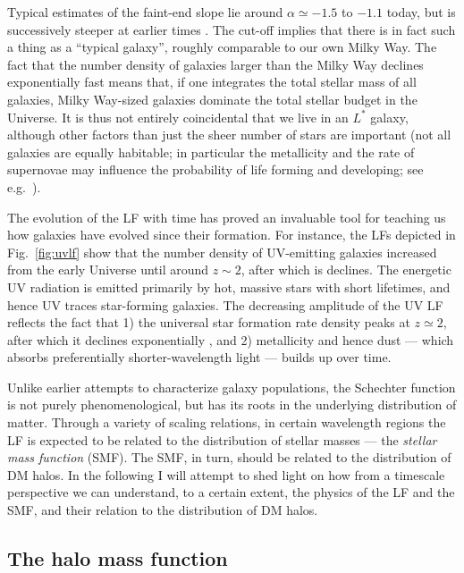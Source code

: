 \documentclass[useAMS]{aa}
\begin{document}
Typical estimates of the faint-end slope lie around $\alpha\simeq-1.5$ to $-1.1$ today, but is successively steeper at earlier times \citep[e.g.][]{Bouwens2021}.
The cut-off implies that there is in fact such a thing as a ``typical galaxy'', roughly comparable to our own Milky Way.
The fact that the number density of galaxies larger than the Milky Way declines exponentially fast means that, if one integrates the total stellar mass of all galaxies, Milky Way-sized galaxies dominate the total stellar budget in the Universe.
It is thus not entirely coincidental that we live in an $L^*$ galaxy, although other factors than just the sheer number of stars are important (not all galaxies are equally habitable; in particular the metallicity and the rate of supernovae may influence the probability of life forming and developing; see e.g.~\citealt{Dayal2015}).

The evolution of the LF with time has proved an invaluable tool for teaching us how galaxies have evolved since their formation.
For instance, the LFs depicted in Fig.~\ref{fig:uvlf} show that the number density of UV-emitting galaxies increased from the early Universe until around $z\sim2$, after which is declines.
The energetic UV radiation is emitted primarily by hot, massive stars with short lifetimes, and hence UV traces star-forming galaxies.
The decreasing amplitude of the UV LF reflects the fact that 1) the universal star formation rate density peaks at $z\simeq2$, after which it declines exponentially \citep{Madau2014}, and 2) metallicity and hence dust --- which absorbs preferentially shorter-wavelength light --- builds up over time.

Unlike earlier attempts to characterize galaxy populations, the Schechter function is not purely phenomenological, but has its roots in the underlying distribution of matter.
Through a variety of scaling relations, in certain wavelength regions the LF is expected to be related to the distribution of stellar masses --- the \emph{stellar mass function} (SMF).
The SMF, in turn, should be related to the distribution of DM halos.
In the following I will attempt to shed light on how from a timescale perspective we can understand, to a certain extent, the physics of the LF and the SMF, and their relation to the distribution of DM halos.

\subsection{The halo mass function}
\label{sec:HMF}
\end{document}
